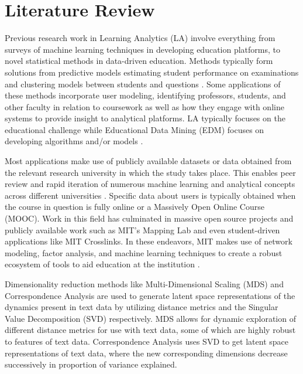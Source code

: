 %
%
%

\chapter{Literature Review}
\label{literature-review}





\indent Previous research work in Learning Analytics (LA) involve everything from surveys of machine learning techniques in developing education platforms, to novel 
statistical methods in data-driven education. Methods typically form solutions from predictive models estimating student performance on examinations and clustering models between students and questions \cite{barbu_data_nodate}. Some applications of these methods incorporate user modeling, identifying professors, students, and other faculty in relation to coursework as well as how they engage with online systems to provide insight to analytical platforms. LA typically focuses on the educational challenge while Educational Data Mining (EDM) focuses on developing algorithms and/or models \cite{hilliger_evaluating_2019}.

\indent Most applications make use of publicly available datasets  or data obtained from the relevant research university in which the 
study takes place. This enables peer review and rapid iteration of numerous machine learning and analytical concepts across different universities \cite{barbu_data_nodate}
\cite{romero_educational_2020}\cite{hilliger_evaluating_2019}.  Specific data about users is typically obtained when the course in question is fully online or a Massively 
Open Online Course (MOOC). Work in this field has culminated in massive open source projects and publicly available work such as MIT’s Mapping Lab and even student-driven 
applications like MIT Crosslinks. In these endeavors, MIT makes use of network modeling,  factor analysis, and machine learning techniques to 
create a robust ecosystem of tools to aid education at the institution \cite{willcox_network_2017}. 

Dimensionality reduction methods like Multi-Dimensional Scaling (MDS) \cite{jjs} and Correspondence Analysis are used to generate latent space representations of the dynamics 
present in text data by utilizing distance metrics and the Singular Value Decomposition (SVD) respectively.  MDS allows for dynamic exploration of different distance metrics 
for use with text data, some of which are highly robust to features of text data.  Correspondence Analysis uses SVD to get latent space representations of text data,  where 
the new corresponding dimensions decrease successively in proportion of variance explained. 

